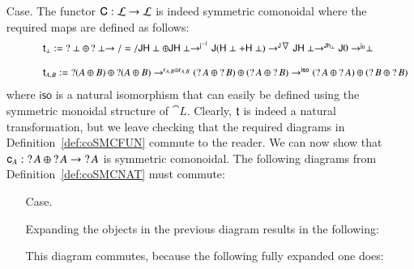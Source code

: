 \begin{itemize}
  \item[Case.] The functor $\func{C} : \cat{L} \mto \cat{L}$ is indeed
    symmetric comonoidal where the required maps are defined as follows:
    \[
    \small
    \begin{array}{lll}
      \quad\quad\quad\t_\perp := \wn \perp \oplus \wn \perp \mto/=/ \J\H\perp \oplus \J\H\perp \mto^{\jinv{}} \J(\H\perp + \H\perp) \mto^{\J\codiag{}} \J\H\perp \mto^{\J\h{\perp}} \J 0 \mto^{\j{0}} \perp\\
      \\
      \quad\quad\quad\t_{A,B} := \wn (A \oplus B) \oplus \wn (A \oplus B) \mto^{\r{A,B} \oplus \r{A,B}} (\wn A \oplus \wn B) \oplus (\wn A \oplus \wn B) \mto^{\iso} (\wn A \oplus \wn A) \oplus (\wn B \oplus \wn B)
    \end{array}
    \]
    where $\mathsf{iso}$ is a natural isomorphism that can easily be
    defined using the symmetric monoidal structure of
    $\cat{L}$. Clearly, $\t$ is indeed a natural transformation, but
    we leave checking that the required diagrams in
    Definition~\ref{def:coSMCFUN} commute to the reader.  We can now
    show that $\c{A} : \wn A \oplus \wn A \mto \wn A$ is symmetric
    comonoidal.  The following diagrams from
    Definition~\ref{def:coSMCNAT} must commute:
    \begin{itemize}
    \item[Case.] \ \\
      \begin{diagram}
      \end{diagram}
      Expanding the objects in the previous diagram results in the following:
      \begin{diagram}
      \end{diagram}
      This diagram commutes, because the following fully expanded one
      does:
      \begin{center}
\end{center}
\end{itemize}
\end{itemize}
